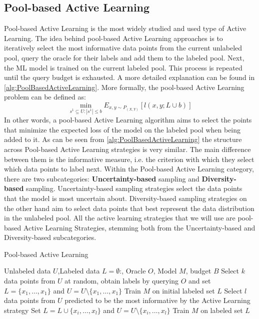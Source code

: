 \subsection{Pool-based Active Learning}
\label{sec:PoolBasedActiveLearning}
Pool-based Active Learning is the most widely studied and used type of Active Learning. The idea behind pool-based Active Learning approaches
is to iteratively select the most informative data points from the current unlabeled pool, query the oracle for their labels and add them to the
labeled pool. Next, the ML model is trained on the current labeled pool. This process is repeated until the query budget is exhausted. A more detailed
explanation can be found in \ref{alg:PoolBasedActiveLearning}. More formally, the pool-based Active Learning problem can be defined as:
\begin{equation}
    \min_{s^1 \subseteq U: |s^1| \leq b} E_{x,y \sim P_{(X,Y)}}[l(x,y;L \cup b)]
\end{equation}
In other words, a pool-based Active Learning algorithm aims to select the points that minimize the expected loss of the model on the labeled pool when
being added to it. As can be seen from  \ref{alg:PoolBasedActiveLearning} the structure across Pool-based Active Learning strategies is very similar.
The main difference between them is the informative measure, i.e. the criterion with which they select which data points to label next. Within the 
Pool-based Active Learning category, there are two subcategories: \textbf{Uncertainty-based} sampling and \textbf{Diversity-based} sampling. 
Uncertainty-based sampling strategies select the data points that the model is most uncertain about. Diversity-based sampling strategies on the other
hand aim to select data points that best represent the data distribution in the unlabeled pool. All the active learning strategies that we will use
are pool-based Active Learning Strategies, stemming both from the Uncertainty-based and Diversity-based subcategories.

\begin{algorithm}
    \caption{Pool-based Active Learning} \label{alg:PoolBasedActiveLearning}
    \begin{algorithmic}[1]
        \Require Unlabeled data $U$,Labeled data $L = \emptyset$:, Oracle $O$, Model $M$, budget $B$
        \State Select $k$ data points from $U$ at random, obtain labels by querying $O$ and set $L=\{x_1,\ldots,x_1\}$
        and $U = U \setminus \{x_1,\ldots,x_1\}$ 
        \State Train $M$ on initial labeled set $L$
            \State Select $l$ data points from $U$ predicted to be the most informative by the Active Learning strategy
            \State Set $L= L \cup \{x_i,\ldots,x_l\}$ and $U = U \setminus \{x_i,\ldots,x_l\}$
            \State Train $M$ on labeled set $L$
        \EndWhile
    \end{algorithmic}
\end{algorithm}


